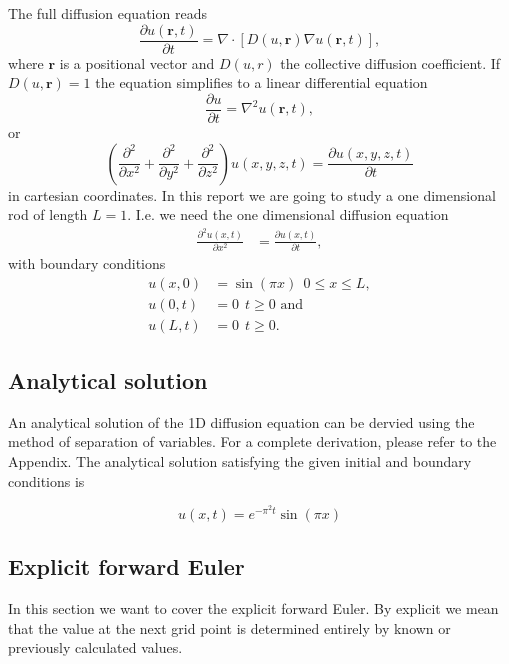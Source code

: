 \documentclass[12pt]{extarticle}
\begin{document}
The full diffusion equation reads
\begin{equation}
\frac{\partial u(\mathbf{r}, t)}{\partial t} = \nabla \cdot \left[D(u, \mathbf{r})\nabla u(\mathbf{r}, t)\right],
\end{equation}
where $\mathbf{r}$ is a positional vector and $D(u,r)$ the collective diffusion coefficient. If $D(u,\mathbf{r}) = 1$ the equation simplifies to a linear differential equation
\begin{equation}
\frac{\partial u}{\partial t} = \nabla^2u(\mathbf{r}, t),
\end{equation}
or
\begin{equation}
\label{eq:diffusion_equation}
\left(\frac{\partial^2}{\partial x^2} + \frac{\partial^2}{\partial y^2} + \frac{\partial^2}{\partial z^2}\right) u(x,y,z,t) = \frac{\partial u(x,y,z,t)}{\partial t}
\end{equation}
in cartesian coordinates. In this report we are going to study a one dimensional rod of length $L=1$. I.e. we need the one dimensional diffusion equation
\begin{align}
\label{eq:diffusion_equation_1D}
\frac{\partial^2 u(x,t)}{\partial x^2} &= \frac{\partial u(x,t)}{\partial t},
\end{align}
with boundary conditions
\begin{align}
u(x,0) &= \sin(\pi x) \ \ 0\leq x\leq L,\\
u(0,t) &= 0 \ \ t\geq 0 \text{ and} \\
u(L,t) &= 0 \ \ t\geq 0.
\end{align}

\subsection{Analytical solution}


An analytical solution of the 1D diffusion equation can be dervied using the method of separation of variables.
For a complete derivation, please refer to the Appendix.
The analytical solution satisfying the given initial and boundary conditions is

\[ u(x,t) = e^{-\pi^2 t} \sin(\pi x) \]


\subsection{Explicit forward Euler}
In this section we want to cover the explicit forward Euler. By explicit we mean that the value at the next grid point is determined entirely by known or previously calculated values.
\end{document}
